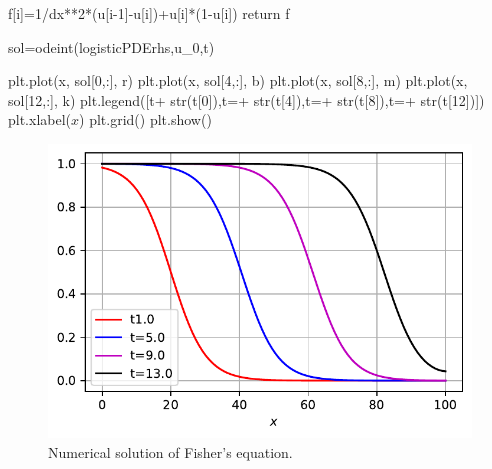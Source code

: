 \documentclass[
  letterpaper,
  DIV=11,
  numbers=noendperiod]{scrreprt}
\newenvironment{Shaded}{\begin{snugshade}}{\end{snugshade}}
\newcommand{\BuiltInTok}[1]{\textcolor[rgb]{0.00,0.23,0.31}{#1}}
\newcommand{\ControlFlowTok}[1]{\textcolor[rgb]{0.00,0.23,0.31}{#1}}
\newcommand{\DecValTok}[1]{\textcolor[rgb]{0.68,0.00,0.00}{#1}}
\newcommand{\NormalTok}[1]{\textcolor[rgb]{0.00,0.23,0.31}{#1}}
\newcommand{\OperatorTok}[1]{\textcolor[rgb]{0.37,0.37,0.37}{#1}}
\newcommand{\StringTok}[1]{\textcolor[rgb]{0.13,0.47,0.30}{#1}}
\theoremstyle{plain}
\theoremstyle{definition}
\theoremstyle{plain}
\theoremstyle{remark}
\begin{document}
\begin{Shaded}
\begin{Highlighting}[]
\NormalTok{    f[i]}\OperatorTok{=}\DecValTok{1}\OperatorTok{/}\NormalTok{dx}\OperatorTok{**}\DecValTok{2}\OperatorTok{*}\NormalTok{(u[i}\OperatorTok{{-}}\DecValTok{1}\NormalTok{]}\OperatorTok{{-}}\NormalTok{u[i])}\OperatorTok{+}\NormalTok{u[i]}\OperatorTok{*}\NormalTok{(}\DecValTok{1}\OperatorTok{{-}}\NormalTok{u[i]) }
    \ControlFlowTok{return}\NormalTok{ f  }

\NormalTok{sol}\OperatorTok{=}\NormalTok{odeint(logisticPDErhs,u\_0,t)}

\NormalTok{plt.plot(x, sol[}\DecValTok{0}\NormalTok{,:], }\StringTok{\textquotesingle{}r\textquotesingle{}}\NormalTok{)}
\NormalTok{plt.plot(x, sol[}\DecValTok{4}\NormalTok{,:], }\StringTok{\textquotesingle{}b\textquotesingle{}}\NormalTok{)}
\NormalTok{plt.plot(x, sol[}\DecValTok{8}\NormalTok{,:], }\StringTok{\textquotesingle{}m\textquotesingle{}}\NormalTok{)}
\NormalTok{plt.plot(x, sol[}\DecValTok{12}\NormalTok{,:], }\StringTok{\textquotesingle{}k\textquotesingle{}}\NormalTok{)}
\NormalTok{plt.legend([}\StringTok{\textquotesingle{}t\textquotesingle{}}\OperatorTok{+} \BuiltInTok{str}\NormalTok{(t[}\DecValTok{0}\NormalTok{]),}\StringTok{\textquotesingle{}t=\textquotesingle{}}\OperatorTok{+} \BuiltInTok{str}\NormalTok{(t[}\DecValTok{4}\NormalTok{]),}\StringTok{\textquotesingle{}t=\textquotesingle{}}\OperatorTok{+} \BuiltInTok{str}\NormalTok{(t[}\DecValTok{8}\NormalTok{]),}\StringTok{\textquotesingle{}t=\textquotesingle{}}\OperatorTok{+} \BuiltInTok{str}\NormalTok{(t[}\DecValTok{12}\NormalTok{])])}
\NormalTok{plt.xlabel(}\StringTok{\textquotesingle{}$x$\textquotesingle{}}\NormalTok{)}
\NormalTok{plt.grid()}
\NormalTok{plt.show()}
\end{Highlighting}
\end{Shaded}

\begin{figure}[H]

{\centering \includegraphics{nonlinearreactiondiffusion_files/figure-pdf/fig-logisticpde-output-1.pdf}

}

\caption{\label{fig-logisticpde}Numerical solution of Fisher's
equation.}

\end{figure}
\end{document}
